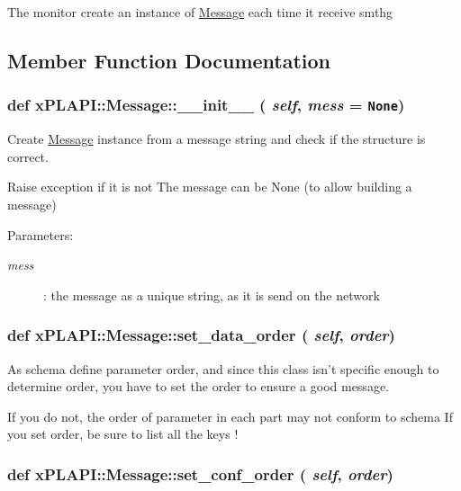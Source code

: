 The monitor create an instance of \hyperlink{classxPLAPI_1_1Message}{Message} each time it receive smthg 

\subsection{Member Function Documentation}
\hypertarget{classxPLAPI_1_1Message_f1efb1186af373f1ce3d107be47e3f3f}{
\subsubsection[\_\-\_\-init\_\-\_\-]{\setlength{\rightskip}{0pt plus 5cm}def xPLAPI::Message::\_\-\_\-init\_\-\_\- ( {\em self}, \/   {\em mess} = {\tt None})}}
\label{classxPLAPI_1_1Message_f1efb1186af373f1ce3d107be47e3f3f}


Create \hyperlink{classxPLAPI_1_1Message}{Message} instance from a message string and check if the structure is correct. 

Raise exception if it is not The message can be None (to allow building a message) \begin{Desc}
\item[Parameters:]
\begin{description}
\item[{\em mess}]: the message as a unique string, as it is send on the network \end{description}
\end{Desc}
\hypertarget{classxPLAPI_1_1Message_254a763505a2ddb64ecd8d1b96f984d6}{
\subsubsection[set\_\-data\_\-order]{\setlength{\rightskip}{0pt plus 5cm}def xPLAPI::Message::set\_\-data\_\-order ( {\em self}, \/   {\em order})}}
\label{classxPLAPI_1_1Message_254a763505a2ddb64ecd8d1b96f984d6}


As schema define parameter order, and since this class isn't specific enough to determine order, you have to set the order to ensure a good message. 

If you do not, the order of parameter in each part may not conform to schema If you set order, be sure to list all the keys ! \hypertarget{classxPLAPI_1_1Message_191e86e1dccd20aa0ea63158429e6d68}{
\subsubsection[set\_\-conf\_\-order]{\setlength{\rightskip}{0pt plus 5cm}def xPLAPI::Message::set\_\-conf\_\-order ( {\em self}, \/   {\em order})}}
\label{classxPLAPI_1_1Message_191e86e1dccd20aa0ea63158429e6d68}


